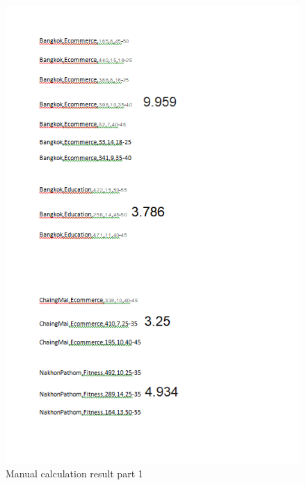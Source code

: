 \documentclass[11pt]{article}
\begin{document}
\begin{figure}[h]
\includegraphics[scale=0.4]{cal2}
\caption{Manual calculation result part 1}
\end{figure}
\newpage
\end{document}
